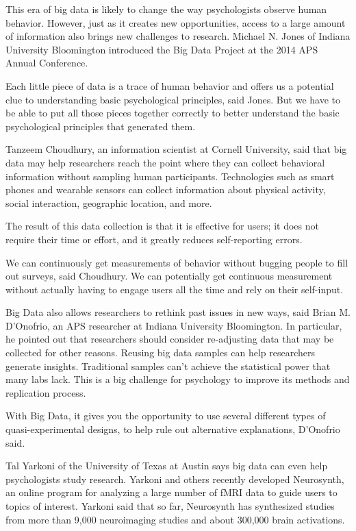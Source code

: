 This era of big data is likely to change the way psychologists observe human behavior. However, just as it creates new opportunities, access to a large amount of information also brings new challenges to research. Michael N. Jones of Indiana University Bloomington introduced the Big Data Project at the 2014 APS Annual Conference.

Each little piece of data is a trace of human behavior and offers us a potential clue to understanding basic psychological principles, said Jones. But we have to be able to put all those pieces together correctly to better understand the basic psychological principles that generated them\cite{editor01}.

Tanzeem Choudhury, an information scientist at Cornell University, said that big data may help researchers reach the point where they can collect behavioral information without sampling human participants. Technologies such as smart phones and wearable sensors can collect information about physical activity, social interaction, geographic location, and more.

The result of this data collection is that it is effective for users; it does not require their time or effort, and it greatly reduces self-reporting errors.

We can continuously get measurements of behavior without bugging people to fill out surveys, said Choudhury. We can potentially get continuous measurement without actually having to engage users all the time and rely on their self-input\cite{editor01}.

Big Data also allows researchers to rethink past issues in new ways, said Brian M. D'Onofrio, an APS researcher at Indiana University Bloomington. In particular, he pointed out that researchers should consider re-adjusting data that may be collected for other reasons. Reusing big data samples can help researchers generate insights. Traditional samples can't achieve the statistical power that many labs lack. This is a big challenge for psychology to improve its methods and replication process.

With Big Data, it gives you the opportunity to use several different types of quasi-experimental designs, to help rule out alternative explanations, D’Onofrio said\cite{editor01}.

Tal Yarkoni of the University of Texas at Austin says big data can even help psychologists study research. Yarkoni and others recently developed Neurosynth, an online program for analyzing a large number of fMRI data to guide users to topics of interest. Yarkoni said that so far, Neurosynth has synthesized studies from more than 9,000 neuroimaging studies and about 300,000 brain activations.


